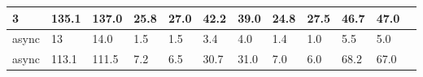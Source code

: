 \documentclass[a4paper]{report}
\begin{document}
\begin{table}[h]
\begin{tabular}{|l|l|l|l|l|l|l|l|l|l|l|l|}
		3                        & 135.1                              & 137.0                           & 25.8                        & 27.0                      & 42.2                           & 39.0   & 24.8 & 27.5   & 46.7 & 47.0   \\ \hline
		async                    & 13                                 & 14.0                            & 1.5                         & 1.5                       & 3.4                            & 4.0    & 1.4  & 1.0    & 5.5  & 5.0    \\ \hline
		async                    & 113.1                              & 111.5                           & 7.2                         & 6.5                       & 30.7                           & 31.0   & 7.0  & 6.0    & 68.2 & 67.0   \\ \hline
	\end{tabular}
\end{table}
\end{document}
